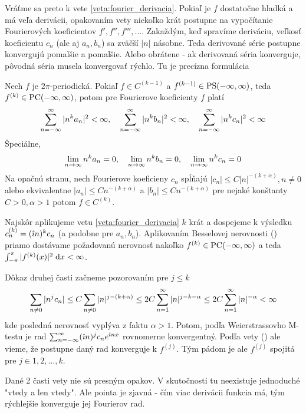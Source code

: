 Vráťme sa preto k vete \ref{veta:fourier_derivacia}. Pokiaľ
je $f$ dostatočne hladká a má veľa derivácii, opakovaním vety
niekoľko krát postupne na vypočítanie Fourierových koeficientov
$f',f'',f''',\dots$. Zakaždým, keď spravíme deriváciu, veľkosť
koeficientu $c_n$ (ale aj $a_n,b_n$) sa zväčší $|n|$ násobne. Teda
derivované série postupne konvergujú pomalšie a pomalšie. Alebo obrátene - 
ak derivovaná séria konverguje, pôvodná séria musela konvergovať
rýchlo. Tu je precízna formulácia
\begin{veta}
    Nech $f$ je $2\pi$-periodická. Pokiaľ
    $f\in C^(k-1)$ a $f^{(k-1)} \in \mbox{PS}(-\infty,\infty)$, teda $f^{(k)} \in
    \mbox{PC}(-\infty,\infty)$, potom pre Fourierove koeficienty $f$ platí
    \begin{equation}
        \sum_{n=-\infty}^{\infty} |n^k a_n|^2 < \infty, \quad
        \sum_{n=-\infty}^{\infty} |n^k b_n|^2 < \infty, \quad
        \sum_{n=-\infty}^{\infty} |n^k c_n|^2 < \infty
    \end{equation}
    Špeciálne,
    \begin{equation}
        \lim_{n \rightarrow \infty} n^k a_n =0, \quad
        \lim_{n \rightarrow \infty} n^k b_n =0, \quad
        \lim_{n \rightarrow \infty} n^k c_n =0
    \end{equation}
    Na opačnú stranu, nech Fourierove koeficieny $c_n$ spĺňajú
    $|c_n| \le C |n|^{-(k+\alpha)}, n\not=0$ alebo ekvivalentne
    $|a_n| \le C n^{-(k+\alpha)}$ a 
    $|b_n| \le C n^{-(k+\alpha)}$ pre nejaké konštanty 
    $C>0, \alpha>1$ potom $f \in C^{(k)}$.
\end{veta}
\begin{dokaz}
    Najskôr aplikujeme vetu  \ref{veta:fourier_derivacia}
    $k$ krát a dospejeme k výsledku
    $c_n^{(k)} = (\hat{\imath} n)^k c_n$ (a podobne pre $a_n,b_n$).
    Aplikovaním Besselovej nerovnosti () priamo
    dostávame požadovanú nerovnosť nakoľko $f^{(k)} \in
    \mbox{PC}(-\infty,\infty)$ a teda $\int_{-\pi}^{\pi} |f^{(k)}(x)|^2 \; \mathrm{d} x < \infty$.

    Dôkaz druhej časti začneme pozorovaním pre $j\le k$
    \begin{equation}
        \sum_{n\not=0} |n^j c_n| \le 
        C \sum_{n\not=0} |n|^{j - (k+\alpha)} \le
        2C \sum_{n=1}^{\infty} |n|^{j-k-\alpha} \le
        2C \sum_{n=1}^{\infty} |n|^{-\alpha} < \infty
    \end{equation}
    kde posledná nerovnosť vyplýva z faktu $\alpha>1$.
    Potom, podľa Weierstrassovho M-testu je rad
    $\sum_{n=-\infty}^{\infty} (\hat{\imath} n)^j c_n e^{\hat{\imath} n x}$ rovnomerne
    konvergentný. Podľa vety () ale vieme, že
    postupne daný rad konverguje k $f^{(j)}$. Tým pádom je ale 
    $f^{(j)}$ spojitá pre $j\in 1,2,\dots,k$.
\end{dokaz}

Dané 2 časti vety nie sú presným opakov. V skutočnosti tu neexistuje
jednoduché "vtedy a len vtedy". Ale pointa je zjavná - čím viac
derivácii funkcia má, tým rýchlejšie konverguje jej Fourierov rad.

